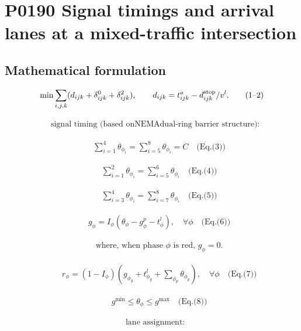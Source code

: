 \documentclass[10pt]{article}
\begin{document}
\section*{P0190 Signal timings and arrival lanes at a mixed-traffic intersection}
\subsection*{Mathematical formulation}
\[
\min \sum_{i,j,k}(d_{ijk}+\delta^0_{ijk}+\delta^2_{ijk}),\qquad
d_{ijk}=t^a_{ijk}-d^{\rm stop}_{ijk}/v^l.\tag{1--2}
\]

\[\begin{aligned}&\text{signal timing (based onNEMAdual-ring barrier structure):}\end{aligned}\]

\[\begin{aligned}&\quad \sum_{i=1}^{4} \theta_{\phi_{i}} = \sum_{i=5}^{8} \theta_{\phi_{i}} = C \quad \text{(Eq.(3))}\end{aligned}\]

\[\begin{aligned}&\quad \sum_{i=1}^{2} \theta_{\phi_{i}} = \sum_{i=5}^{6} \theta_{\phi_{i}} \quad \text{(Eq.(4))}\end{aligned}\]

\[\begin{aligned}&\quad \sum_{i=3}^{4} \theta_{\phi_{i}} = \sum_{i=7}^{8} \theta_{\phi_{i}} \quad \text{(Eq.(5))}\end{aligned}\]

\[\begin{aligned}&\quad g_{\phi} = I_{\phi} (\theta_{\phi} - g^{p}_{\phi} - t^{l}_{\phi}), \quad \forall \phi \quad \text{(Eq.(6))}\end{aligned}\]

\[\begin{aligned}&\quad \text{where, when phase } \phi \text{ is red,  } g_{\phi} = 0.\end{aligned}\]

\[\begin{aligned}&\quad r_{\phi} = (1 - I_{\phi})(g_{\phi_{g}} + t^{l}_{\phi_{g}} + \sum_{\phi_{p}} \theta_{\phi_{p}}), \quad \forall \phi \quad \text{(Eq.(7))}\end{aligned}\]

\[\begin{aligned}&\quad g^{\min} \leq \theta_{\phi} \leq g^{\max} \quad \text{(Eq.(8))}\end{aligned}\]

\[\begin{aligned}&\text{lane assignment:}\end{aligned}\]
\end{document}

